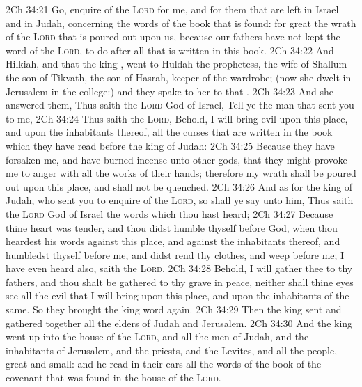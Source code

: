 \vs 2Ch 34:21 Go, enquire of the \textsc{Lord} for me, and for them that are left in Israel and in Judah, concerning the words of the book that is found: for great  the wrath of the \textsc{Lord} that is poured out upon us, because our fathers have not kept the word of the \textsc{Lord}, to do after all that is written in this book.
\vs 2Ch 34:22 And Hilkiah, and  that the king , went to Huldah the prophetess, the wife of Shallum the son of Tikvath, the son of Hasrah, keeper of the wardrobe; (now she dwelt in Jerusalem in the college:) and they spake to her to that .
\vs 2Ch 34:23 And she answered them, Thus saith the \textsc{Lord} God of Israel, Tell ye the man that sent you to me,
\vs 2Ch 34:24 Thus saith the \textsc{Lord}, Behold, I will bring evil upon this place, and upon the inhabitants thereof,  all the curses that are written in the book which they have read before the king of Judah:
\vs 2Ch 34:25 Because they have forsaken me, and have burned incense unto other gods, that they might provoke me to anger with all the works of their hands; therefore my wrath shall be poured out upon this place, and shall not be quenched.
\vs 2Ch 34:26 And as for the king of Judah, who sent you to enquire of the \textsc{Lord}, so shall ye say unto him, Thus saith the \textsc{Lord} God of Israel  the words which thou hast heard;
\vs 2Ch 34:27 Because thine heart was tender, and thou didst humble thyself before God, when thou heardest his words against this place, and against the inhabitants thereof, and humbledst thyself before me, and didst rend thy clothes, and weep before me; I have even heard  also, saith the \textsc{Lord}.
\vs 2Ch 34:28 Behold, I will gather thee to thy fathers, and thou shalt be gathered to thy grave in peace, neither shall thine eyes see all the evil that I will bring upon this place, and upon the inhabitants of the same. So they brought the king word again.
\vs 2Ch 34:29 Then the king sent and gathered together all the elders of Judah and Jerusalem.
\vs 2Ch 34:30 And the king went up into the house of the \textsc{Lord}, and all the men of Judah, and the inhabitants of Jerusalem, and the priests, and the Levites, and all the people, great and small: and he read in their ears all the words of the book of the covenant that was found in the house of the \textsc{Lord}.
